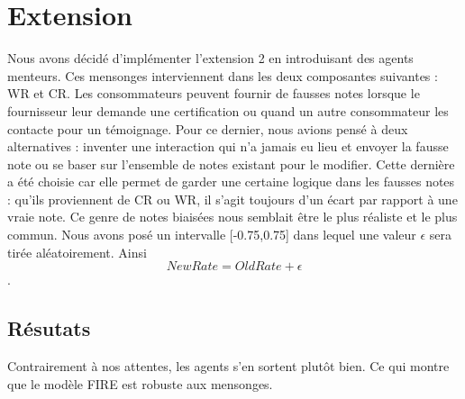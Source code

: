 \section{Extension}
Nous avons décidé d'implémenter l'extension 2 en introduisant des agents menteurs. Ces mensonges interviennent dans les deux composantes suivantes : WR et CR. Les consommateurs peuvent fournir de fausses notes lorsque le fournisseur leur demande une certification ou quand un autre consommateur les contacte pour un témoignage. Pour ce dernier, nous avions pensé à deux alternatives : inventer une interaction qui n'a jamais eu lieu et envoyer la fausse note ou se baser sur l'ensemble de notes existant pour le modifier. Cette dernière a été choisie car elle permet de garder une certaine logique dans les fausses notes : qu'ils proviennent de CR ou WR, il s'agit toujours d'un écart par rapport à une vraie note. Ce genre de notes biaisées nous semblait être le plus réaliste et le plus commun.
Nous avons posé un intervalle [-0.75,0.75] dans lequel une valeur $\epsilon$ sera tirée aléatoirement. Ainsi \[NewRate = OldRate + \epsilon\].
\subsection{Résutats}
Contrairement à nos attentes, les agents s'en sortent plutôt bien. Ce qui montre que le modèle FIRE est robuste aux mensonges.

